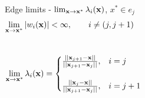 \documentclass[compress,10pt]{beamer}
\renewcommand{\vec}[1]{\mathbf{#1}}
\newcommand{\backupend}{
    \setcounter{framenumber}{\value{finalframe}}
}
\begin{document}
\begin{frame}[t,label=poly_limits]
\begin{columns}
\begin{block}{\small Edge limits - $\lim\displaylimits_{\vec{x} \rightarrow \vec{x}^*} \lambda_i (\vec{x})$, $x^* \in  e_j$}
{\begin{equation*}
\begin{aligned}
\lim\displaylimits_{\vec{x} \rightarrow \vec{x}^*} \left|   w_i (\vec{x})  \right| &< \infty, \qquad i \neq (j,j+1)
\end{aligned}
\end{equation*}\\ \vspace{3mm}
\begin{equation*}
\lim\displaylimits_{\vec{x} \rightarrow \vec{x}^*} \lambda_i (\vec{x}) = 
\begin{cases}
\frac{|| \vec{x}_{j+1} - \vec{x}  ||}{|| \vec{x}_{j+1} - \vec{x}_{j}  ||}, & i=j \\ \, \\
\frac{|| \vec{x}_{j} - \vec{x}  ||}{|| \vec{x}_{j+1} - \vec{x}_{j}  ||}, & i=j+1
\end{cases}
\end{equation*}
}\end{block}
\end{columns}
\end{frame}
\backupend
\end{document}
